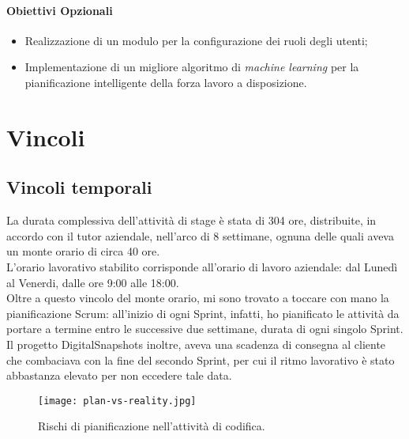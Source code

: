 \paragraph*{Obiettivi Opzionali}
\begin{itemize}
\item Realizzazione di un modulo per la configurazione dei ruoli degli utenti;
\item Implementazione di un migliore algoritmo di \textit{machine learning} per la pianificazione intelligente della forza lavoro a disposizione.
\end{itemize}

\section{Vincoli}
\subsection{Vincoli temporali}

La durata complessiva dell'attività di stage è stata di 304 ore, distribuite, in accordo con il tutor aziendale, nell'arco di 8 settimane, ognuna delle quali aveva un monte orario di circa 40 ore. \\
L'orario lavorativo stabilito corrisponde all'orario di lavoro aziendale: dal Lunedì al Venerdi, dalle ore 9:00 alle 18:00.\\
Oltre a questo vincolo del monte orario, mi sono trovato a toccare con mano la pianificazione Scrum: all'inizio di ogni Sprint, infatti, ho pianificato le attività da portare a termine entro le successive due settimane, durata di ogni singolo Sprint.\\
Il progetto DigitalSnapshots inoltre, aveva una scadenza di consegna al cliente che combaciava con la fine del secondo Sprint, per cui il ritmo lavorativo è stato abbastanza elevato per non eccedere tale data.

\begin{figure}[h]
\texttt{[image: plan-vs-reality.jpg]}
\centering
\caption{Rischi di pianificazione nell'attività di codifica.} 
\label{fig:plan-vs-reality}
\end{figure}

